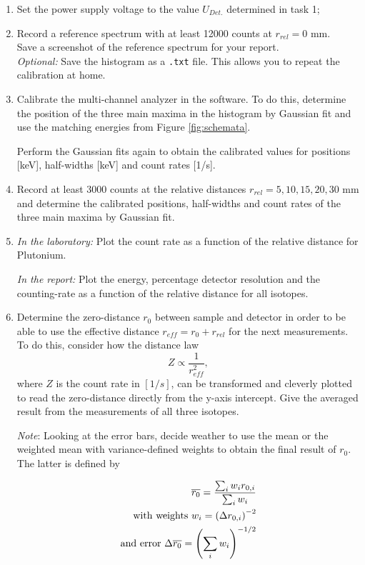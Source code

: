 \begin{enumerate}[label=\textbf{\alph*)}]
	\item Set the power supply voltage to the value $U_{Det.}$ determined in task 1;
	\item Record a reference spectrum with at least 12000 counts at $r_{rel} = 0$ mm.
		\\ Save a screenshot of the reference spectrum for your report.
		\\ \textit{Optional: } Save the histogram as a \texttt{.txt} file. This allows you to repeat the calibration at home.
	\item Calibrate the multi-channel analyzer in the software. To do this, determine the position of the three main maxima in the histogram by Gaussian fit and use the matching energies from Figure \ref{fig:schemata}. 
	
	Perform the Gaussian fits again to obtain the calibrated values for positions [keV], half-widths [keV] and count rates [1/s].
	\item Record at least 3000 counts at the relative distances $r_{rel} = 5, 10, 15, 20, 30$ mm and determine the calibrated positions, half-widths and count rates of the three main maxima by Gaussian fit.
	\item \textit{In the laboratory:} Plot the count rate as a function of the relative distance for Plutonium.
	
	\textit{In the report:} Plot the energy, percentage detector resolution and the counting-rate as a function of the relative distance for all isotopes.
	\item Determine the zero-distance $r_0$ between sample and detector in order to be able to use the effective distance $r_{eff} = r_0 + r_{rel}$ for the next measurements. To do this, consider how the distance law
	\begin{equation}
		Z \propto \frac{1}{r^2_{eff}},
	\end{equation}
	where $Z$ is the count rate in $[1/s]$, can be transformed and cleverly plotted to read the zero-distance directly from the y-axis intercept. Give the averaged result from the measurements of all three isotopes.
 
    \textit{Note}: Looking at the error bars, decide weather to use the mean or the weighted mean with variance-defined weights to obtain the final result of $r_0$. The latter is defined by 

    \begin{subequations}\label{eq:weightmean}
    \begin{align}
		\overline{r_0} = \frac{\sum_i w_i r_{0,i}}{\sum_i w_i} \\
        \textnormal{with weights } w_i = \left( \Delta r_{0,i} \right)^{-2} \\
        \textnormal{and error } \Delta \overline{r_0} = \left( \sum_i w_i \right)^{-1/2}
    \end{align}
    \end{subequations}
\end{enumerate}
%
